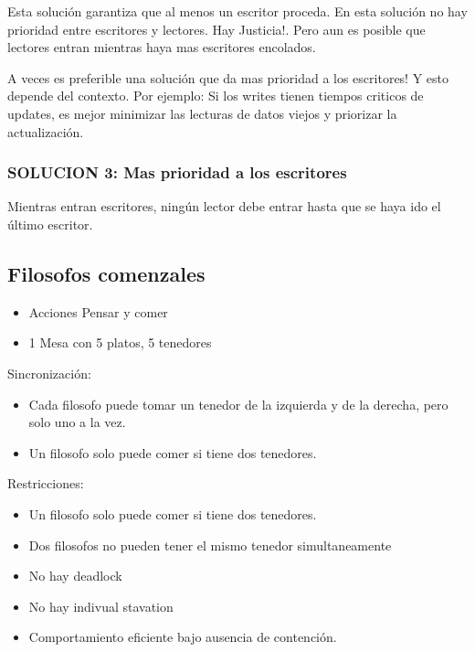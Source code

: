 \documentclass{article}
\begin{document}


Esta solución garantiza que al menos un escritor proceda. En esta solución no hay prioridad entre escritores y lectores. Hay Justicia!. Pero aun es posible que lectores entran mientras haya mas escritores encolados.

A veces es preferible una solución que da mas prioridad a los escritores! Y esto depende del contexto.
Por ejemplo: Si los writes tienen tiempos criticos de updates, es mejor minimizar las lecturas de datos viejos y priorizar la actualización.

\newpage
\subsubsection{SOLUCION 3: Mas prioridad a los escritores}

Mientras entran escritores, ningún lector debe entrar hasta que se haya ido el último escritor.



\newpage
\subsection{Filosofos comenzales}
\begin{itemize}
    \item Acciones Pensar y comer
    \item 1 Mesa con 5 platos, 5 tenedores
\end{itemize}

Sincronización:
\begin{itemize}
    \item Cada filosofo puede tomar un tenedor de la izquierda y de la derecha, pero solo uno a la vez.
    \item Un filosofo solo puede comer si tiene dos tenedores.
\end{itemize}

Restricciones:
\begin{itemize}
    \item Un filosofo solo puede comer si tiene dos tenedores.
    \item Dos filosofos no pueden tener el mismo tenedor simultaneamente
    \item No hay deadlock
    \item No hay indivual stavation
    \item Comportamiento eficiente bajo ausencia de contención.
\end{itemize}
\end{document}
